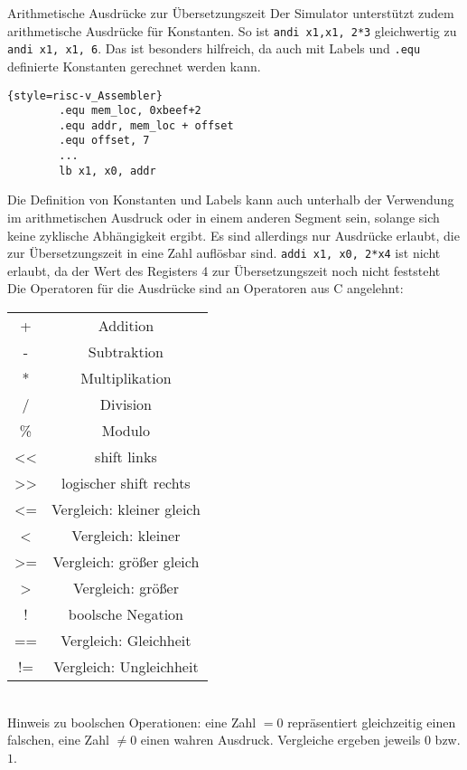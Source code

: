 \begin{infoblock}{Arithmetische Ausdrücke zur Übersetzungszeit}
	Der Simulator unterstützt zudem arithmetische Ausdrücke für Konstanten. So ist \texttt{andi x1,x1, 2*3} gleichwertig zu \texttt{andi x1, x1, 6}. Das ist besonders hilfreich, da auch mit Labels und \texttt{.equ} definierte Konstanten gerechnet werden kann.\\
	\begin{lstlisting}{style=risc-v_Assembler}
		.equ mem_loc, 0xbeef+2
		.equ addr, mem_loc + offset
		.equ offset, 7
		...
		lb x1, x0, addr
	\end{lstlisting}
	Die Definition von Konstanten und Labels kann auch unterhalb der Verwendung im arithmetischen Ausdruck oder in einem anderen Segment sein, solange sich keine zyklische Abhängigkeit ergibt. Es sind allerdings nur Ausdrücke erlaubt, die zur Übersetzungszeit in eine Zahl auflösbar sind. \texttt{addi x1, x0, 2*x4} ist nicht erlaubt, da der Wert des Registers 4 zur Übersetzungszeit noch nicht feststeht\\
	Die Operatoren für die Ausdrücke sind an Operatoren aus C angelehnt:\\
		\begin{tabular}{|c|c|}
			+ & Addition \\
			- & Subtraktion \\
			* & Multiplikation \\
			/ & Division \\
			\% & Modulo \\
			<< & shift links\\
			>> & logischer shift rechts\\
			<= & Vergleich: kleiner gleich\\
			< & Vergleich: kleiner\\
			>= & Vergleich: größer gleich\\
			> & Vergleich: größer\\
			! & boolsche Negation\\
			== & Vergleich: Gleichheit\\
			!= & Vergleich: Ungleichheit\\
		\end{tabular}\\
	Hinweis zu boolschen Operationen: eine Zahl $=0$ repräsentiert gleichzeitig einen falschen, eine Zahl $\neq 0$ einen wahren Ausdruck. Vergleiche ergeben jeweils $0$ bzw. $1$.
\end{infoblock}

